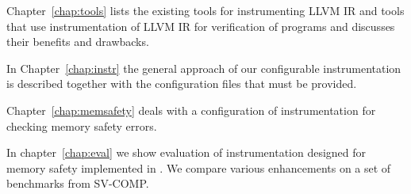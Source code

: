 Chapter~\ref{chap:tools} lists the existing tools for instrumenting LLVM IR and
tools that use instrumentation of LLVM IR for verification of programs and
discusses their benefits and drawbacks.

In Chapter~\ref{chap:instr} the general approach of our configurable
instrumentation is described together with the configuration files that must
be provided.

Chapter~\ref{chap:memsafety} deals with a configuration of instrumentation for
checking memory safety errors.

In chapter~\ref{chap:eval} we show evaluation of instrumentation designed
for memory safety implemented in \symbiotic. We compare various enhancements on
a set of benchmarks from SV-COMP.
